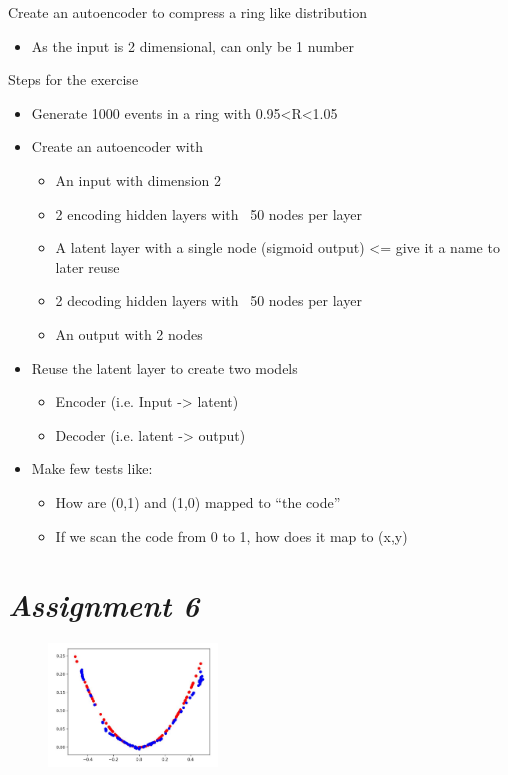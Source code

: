 Create an autoencoder to compress a ring like distribution
\begin{itemize}
	\item As the input is 2 dimensional, can only be 1 number
\end{itemize}
Steps for the exercise
\begin{itemize}
	\item Generate 1000 events in a ring with 0.95<R<1.05
	\item Create an autoencoder with
	\begin{itemize}
		\item An input with dimension 2
		\item 2 encoding hidden layers with ~50 nodes per layer
		\item A latent layer with a single node (sigmoid output) <= give it a name to later reuse
		\item 2 decoding hidden layers with ~50 nodes per layer
		\item An output with 2 nodes
	\end{itemize}
	\item Reuse the latent layer to create two models
	\begin{itemize}
		\item Encoder (i.e. Input -> latent)
		\item Decoder (i.e. latent -> output)
	\end{itemize}
	\item Make few tests like:
	\begin{itemize}
		\item How are (0,1) and (1,0) mapped to “the code”
		\item If we scan the code from 0 to 1, how does it map to (x,y)
	\end{itemize}
\end{itemize}

\section{\textit{Assignment 6}}

\begin{figure}
	\includegraphics[width=0.4\textwidth]{figure_ml/ass6.png}
\end{figure} 


